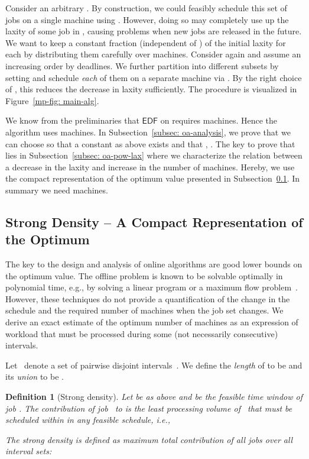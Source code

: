 \documentclass[letterpaper,11pt]{article}
\newtheorem{definition}{Definition}
\newcommand{\EDF}{\ensuremath{\mathsf{EDF}}\xspace}
\begin{document}
Consider an arbitrary . By construction, we could feasibly schedule this set of jobs on a single machine using . However, doing so may completely use up the laxity of some job in , causing problems when new jobs are released in the future. We want to keep a constant fraction  (independent of ) of the initial laxity  for each  by distributing them carefully over  machines. Consider again  and assume an increasing order by deadlines. We further partition  into  different subsets  by setting  and schedule {\em each} of them on a separate machine via . By the right choice of , this reduces the decrease in laxity sufficiently. The procedure is visualized in Figure~\ref{mp-fig: main-alg}.

We know from the preliminaries that \EDF on  requires  machines. Hence the algorithm uses  machines. In Subsection~\ref{subsec: oa-analysis}, we prove that we can choose  so that a constant  as above exists and that , . The key to prove that lies in Subsection~\ref{subsec: oa-pow-lax} where we characterize the relation between a decrease in the laxity and increase in the number of machines. Hereby, we use the compact representation of the optimum value presented in Subsection~\ref{subsec:optimum}. In summary we need  machines. 

\subsection{Strong Density -- A Compact Representation of the Optimum}
\label{subsec:optimum}

The key to the design and analysis of online algorithms are good lower bounds on the optimum value. The offline problem is known to be solvable optimally in polynomial time, e.g., by solving a linear program or a maximum flow problem~\cite{horn74}. However, these techniques do not provide a quantification of the change in the schedule and the required number of machines when the job set changes. We derive an exact estimate of the optimum number of machines as an expression of workload that must be processed during some (not necessarily consecutive) intervals.





Let~ denote a set of  pairwise disjoint intervals~. We define the {\em length} of  to be  and its {\em union} to be . 

\begin{definition}[Strong density]
  Let  be as above and  be the feasible time window of job . The contribution  of job~ to  is the least processing volume of~ that must be scheduled within  in any feasible schedule, i.e.,

The strong density  is defined as maximum total contribution of all jobs over all interval sets:

\end{definition}
\end{document}
